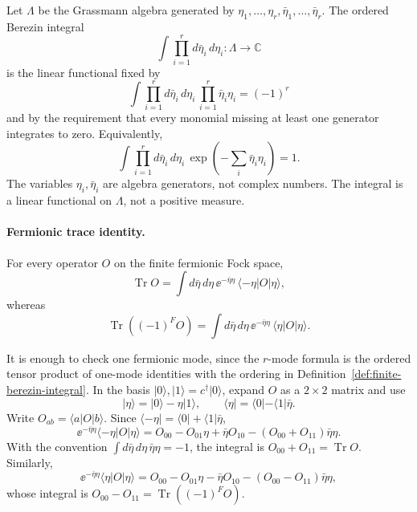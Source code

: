 \begin{definition}
\label{def:finite-berezin-integral}
Let \(\Lambda\) be the Grassmann algebra generated by
\(\eta_1,\ldots,\eta_r,\bar\eta_1,\ldots,\bar\eta_r\).  The ordered Berezin
integral
\[
  \int \prod_{i=1}^r d\bar\eta_i\,d\eta_i:\Lambda\longrightarrow\mathbb C
\]
is the linear functional fixed by
\begin{equation}
  \int \prod_{i=1}^r d\bar\eta_i\,d\eta_i\,
  \prod_{i=1}^r \bar\eta_i\eta_i
  =
  (-1)^r
  \label{eq:finite-berezin-normalization}
\end{equation}
and by the requirement that every monomial missing at least one generator
integrates to zero.  Equivalently,
\begin{equation}
  \int \prod_{i=1}^r d\bar\eta_i\,d\eta_i\,
  \exp\!\left(-\sum_i\bar\eta_i\eta_i\right)
  =
  1 .
  \label{eq:finite-berezin-gaussian-normalization}
\end{equation}
The variables \(\eta_i,\bar\eta_i\) are algebra generators, not complex
numbers.  The integral is a linear functional on \(\Lambda\), not a positive
measure.
\end{definition}

\paragraph{Fermionic trace identity.}
For every operator \(O\) on the finite fermionic Fock space,
\[
  \operatorname{Tr}O
  =
  \int d\bar\eta\,d\eta\,
  \ee^{-\bar\eta\eta}\,
  \langle-\eta|O|\eta\rangle ,
\]
whereas
\[
  \operatorname{Tr}((-1)^F O)
  =
  \int d\bar\eta\,d\eta\,
  \ee^{-\bar\eta\eta}\,
  \langle\eta|O|\eta\rangle .
\]

It is enough to check one fermionic mode, since the \(r\)-mode formula is the
ordered tensor product of one-mode identities with the ordering in
Definition~\ref{def:finite-berezin-integral}.  In the basis
\(|0\rangle,|1\rangle=c^\dagger|0\rangle\), expand \(O\) as a \(2\times2\)
matrix and use
\[
  |\eta\rangle=|0\rangle-\eta|1\rangle,
  \qquad
  \langle\eta|=\langle0|-\langle1|\bar\eta .
\]
Write \(O_{ab}=\langle a|O|b\rangle\).  Since
\(\langle-\eta|=\langle0|+\langle1|\bar\eta\),
\[
  \ee^{-\bar\eta\eta}\langle-\eta|O|\eta\rangle
  =
  O_{00}-O_{01}\eta+\bar\eta O_{10}
  -(O_{00}+O_{11})\bar\eta\eta .
\]
With the convention
\(\int d\bar\eta\,d\eta\,\bar\eta\eta=-1\), the integral is
\(O_{00}+O_{11}=\operatorname{Tr}O\).  Similarly,
\[
  \ee^{-\bar\eta\eta}\langle\eta|O|\eta\rangle
  =
  O_{00}-O_{01}\eta-\bar\eta O_{10}
  -(O_{00}-O_{11})\bar\eta\eta ,
\]
whose integral is \(O_{00}-O_{11}=\operatorname{Tr}((-1)^F O)\).

